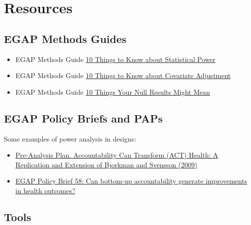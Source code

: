 \documentclass[12pt,]{book}
\begin{document}
\hypertarget{resources-5}{%
\section{Resources}\label{resources-5}}

\hypertarget{egap-methods-guides-5}{%
\subsection{EGAP Methods Guides}\label{egap-methods-guides-5}}

\begin{itemize}
\item
  EGAP Methods Guide \href{https://egap.org/resource/10-things-to-know-about-statistical-power/}{10 Things to Know about Statistical Power}
\item
  EGAP Methods Guide \href{https://egap.org/resource/10-things-to-know-about-covariate-adjustment/}{10 Things to Know about Covariate Adjustment}
\item
  EGAP Methods Guide \href{https://egap.org/resource/10-things-your-null-result-might-mean/}{10 Things Your Null Results Might Mean}
\end{itemize}

\hypertarget{egap-policy-briefs-and-paps}{%
\subsection{EGAP Policy Briefs and PAPs}\label{egap-policy-briefs-and-paps}}

Some examples of power analysis in designs:

\begin{itemize}
\item
  \href{https://osf.io/qxwmu/}{Pre-Analysis Plan. Accountability Can Transform (ACT) Health: A Replication and Extension of Bjorkman and Svensson (2009)}
\item
  \href{https://egap.org/resource/does-bottom-up-accountability-work-evidence-from-uganda/}{EGAP Policy Brief 58: Can bottom-up accountability generate improvements in health outcomes?}
\end{itemize}

\hypertarget{tools-3}{%
\subsection{Tools}\label{tools-3}}
\end{document}
